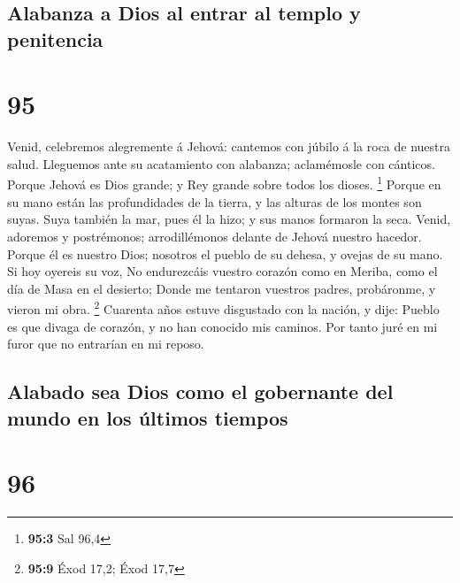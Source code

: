 \hypertarget{alabanza-a-dios-al-entrar-al-templo-y-penitencia}{%
\subsection{Alabanza a Dios al entrar al templo y
penitencia}\label{alabanza-a-dios-al-entrar-al-templo-y-penitencia}}

\hypertarget{section-94}{%
\section{95}\label{section-94}}

 Venid, celebremos alegremente á Jehová: cantemos con júbilo
á la roca de nuestra salud.  Lleguemos ante su acatamiento
con alabanza; aclamémosle con cánticos.  Porque Jehová es
Dios grande; y Rey grande sobre todos los dioses. \footnote{\textbf{95:3}
  Sal 96,4}  Porque en su mano están las profundidades de la
tierra, y las alturas de los montes son suyas.  Suya también
la mar, pues él la hizo; y sus manos formaron la seca. 
Venid, adoremos y postrémonos; arrodillémonos delante de Jehová nuestro
hacedor.  Porque él es nuestro Dios; nosotros el pueblo de
su dehesa, y ovejas de su mano. Si hoy oyereis su voz,  No
endurezcáis vuestro corazón como en Meriba, como el día de Masa en el
desierto;  Donde me tentaron vuestros padres, probáronme, y
vieron mi obra. \footnote{\textbf{95:9} Éxod 17,2; Éxod 17,7}
 Cuarenta años estuve disgustado con la nación, y dije:
Pueblo es que divaga de corazón, y no han conocido mis caminos.
 Por tanto juré en mi furor que no entrarían en mi reposo.

\hypertarget{alabado-sea-dios-como-el-gobernante-del-mundo-en-los-uxfaltimos-tiempos}{%
\subsection{Alabado sea Dios como el gobernante del mundo en los últimos
tiempos}\label{alabado-sea-dios-como-el-gobernante-del-mundo-en-los-uxfaltimos-tiempos}}

\hypertarget{section-95}{%
\section{96}\label{section-95}}

